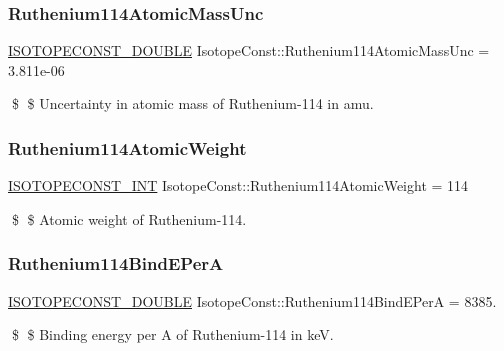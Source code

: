 \subsubsection{\texorpdfstring{Ruthenium114\+Atomic\+Mass\+Unc}{Ruthenium114AtomicMassUnc}}
{\footnotesize\ttfamily \mbox{\hyperlink{group___isotope_const-_macros_ga8f45a7272ce02c0b4c65c44636ed719a}{I\+S\+O\+T\+O\+P\+E\+C\+O\+N\+S\+T\+\_\+\+D\+O\+U\+B\+LE}} Isotope\+Const\+::\+Ruthenium114\+Atomic\+Mass\+Unc = 3.\+811e-\/06}

\$ \$ Uncertainty in atomic mass of Ruthenium-\/114 in amu. \mbox{\label{group___isotope_const-_ruthenium-_ru114_ga2530f96280835bb7789a3cd556bbc24e}} 
\subsubsection{\texorpdfstring{Ruthenium114\+Atomic\+Weight}{Ruthenium114AtomicWeight}}
{\footnotesize\ttfamily \mbox{\hyperlink{group___isotope_const-_macros_ga5f18360b3e99483a35c32d789e62621c}{I\+S\+O\+T\+O\+P\+E\+C\+O\+N\+S\+T\+\_\+\+I\+NT}} Isotope\+Const\+::\+Ruthenium114\+Atomic\+Weight = 114}

\$ \$ Atomic weight of Ruthenium-\/114. \mbox{\label{group___isotope_const-_ruthenium-_ru114_ga21e5e64cff26e8157c4cbd62cc8d7f2a}} 
\subsubsection{\texorpdfstring{Ruthenium114\+Bind\+E\+PerA}{Ruthenium114BindEPerA}}
{\footnotesize\ttfamily \mbox{\hyperlink{group___isotope_const-_macros_ga8f45a7272ce02c0b4c65c44636ed719a}{I\+S\+O\+T\+O\+P\+E\+C\+O\+N\+S\+T\+\_\+\+D\+O\+U\+B\+LE}} Isotope\+Const\+::\+Ruthenium114\+Bind\+E\+PerA = 8385.}

\$ \$ Binding energy per A of Ruthenium-\/114 in keV. \mbox{\label{group___isotope_const-_ruthenium-_ru114_ga0ef82fc8290150be0eb74815f38cd2a4}} 
